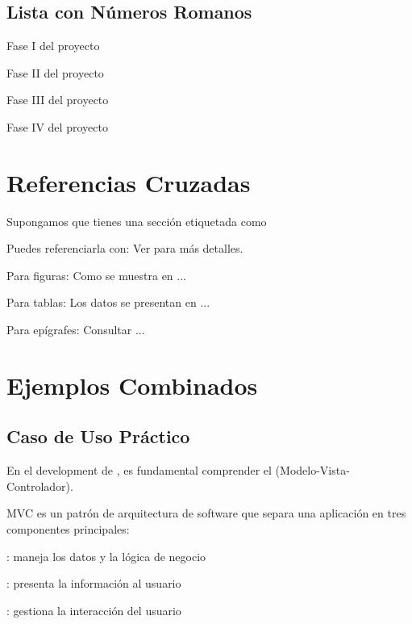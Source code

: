 \documentclass{template_pid}
\begin{document}
\subsection{Lista con Números Romanos}

\begin{listaromana}
    \item Fase I del proyecto
    \item Fase II del proyecto
    \item Fase III del proyecto
    \item Fase IV del proyecto
\end{listaromana}

\section{Referencias Cruzadas}

Supongamos que tienes una sección etiquetada como 

Puedes referenciarla con: Ver  para más detalles.

Para figuras: Como se muestra en ...

Para tablas: Los datos se presentan en ...

Para epígrafes: Consultar ...

\section{Ejemplos Combinados}

\subsection{Caso de Uso Práctico}

En el development de , es fundamental comprender
el  (Modelo-Vista-Controlador).

\begin{definicion}{MVC}
 es un patrón de arquitectura de software que separa
una aplicación en tres componentes principales:
\begin{listapuntos}
    \item {}: maneja los datos y la lógica de negocio
    \item {}: presenta la información al usuario
    \item {}: gestiona la interacción del usuario
\end{listapuntos}
\end{definicion}
\end{document}
